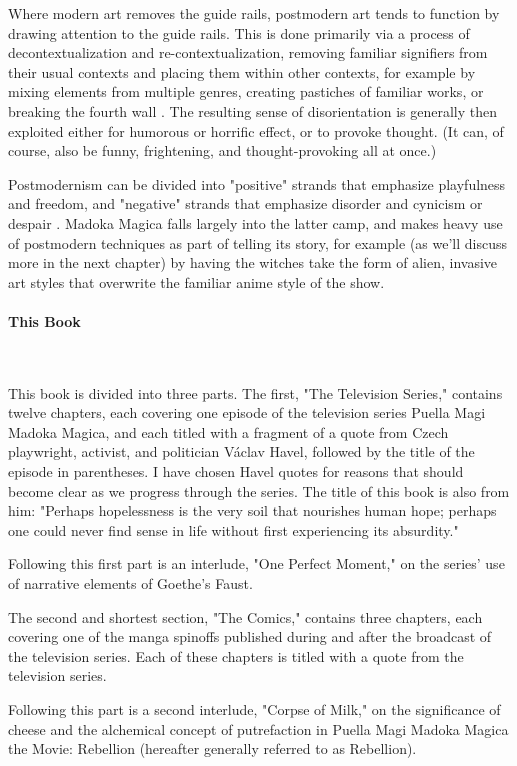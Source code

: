 Where modern art removes the guide rails, postmodern art tends to function by drawing attention to the guide rails. This is done primarily via a process of decontextualization and re-contextualization, removing familiar signifiers from their usual contexts and placing them within other contexts, for example by mixing elements from multiple genres, creating pastiches of familiar works, or breaking the fourth wall \cite{ref7}. The resulting sense of disorientation is generally then exploited either for humorous or horrific effect, or to provoke thought. (It can, of course, also be funny, frightening, and thought-provoking all at once.)

Postmodernism can be divided into "positive" strands that emphasize playfulness and freedom, and "negative" strands that emphasize disorder and cynicism or despair \cite{ref8}. Madoka Magica falls largely into the latter camp, and makes heavy use of postmodern techniques as part of telling its story, for example (as we'll discuss more in the next chapter) by having the witches take the form of alien, invasive art styles that overwrite the familiar anime style of the show.
\paragraph{This Book}~{}

This book is divided into three parts. The first, "The Television Series," contains twelve chapters, each covering one episode of the television series Puella Magi Madoka Magica, and each titled with a fragment of a quote from Czech playwright, activist, and politician Václav Havel, followed by the title of the episode in parentheses. I have chosen Havel quotes for reasons that should become clear as we progress through the series. The title of this book is also from him: "Perhaps hopelessness is the very soil that nourishes human hope; perhaps one could never find sense in life without first experiencing its absurdity." \cite{ref9} 

Following this first part is an interlude, "One Perfect Moment," on the series' use of narrative elements of Goethe's Faust.

The second and shortest section, "The Comics," contains three chapters, each covering one of the manga spinoffs published during and after the broadcast of the television series. Each of these chapters is titled with a quote from the television series.

Following this part is a second interlude, "Corpse of Milk," on the significance of cheese and the alchemical concept of putrefaction in Puella Magi Madoka Magica the Movie: Rebellion (hereafter generally referred to as Rebellion).

